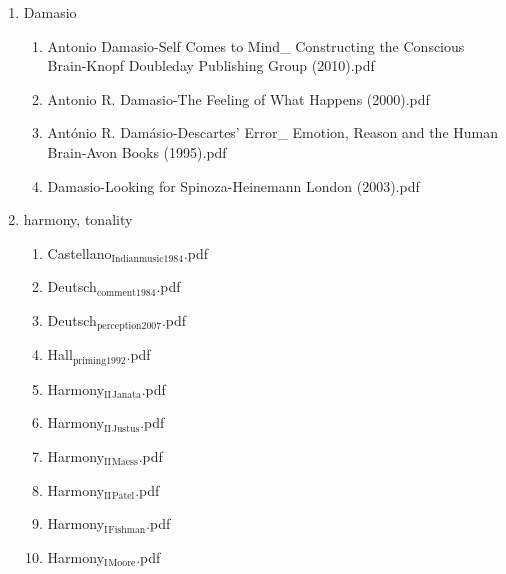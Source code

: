 \documentclass[11pt]{article}
\begin{document}
\begin{enumerate}
\item Damasio
\label{sec-1-1-1-1-30-27}
\begin{enumerate}
\item Antonio Damasio-Self Comes to Mind\_ Constructing the Conscious Brain-Knopf Doubleday Publishing Group (2010).pdf
\label{sec-1-1-1-1-30-27-1}

\item Antonio R. Damasio-The Feeling of What Happens (2000).pdf
\label{sec-1-1-1-1-30-27-2}

\item António R. Damásio-Descartes’ Error\_ Emotion, Reason and the Human Brain-Avon Books (1995).pdf
\label{sec-1-1-1-1-30-27-3}

\item Damasio-Looking for Spinoza-Heinemann London (2003).pdf
\label{sec-1-1-1-1-30-27-4}
\end{enumerate}

\item harmony, tonality
\label{sec-1-1-1-1-30-28}
\begin{enumerate}
\item Castellano$_{\text{Indianmusic1984}}$.pdf
\label{sec-1-1-1-1-30-28-1}

\item Deutsch$_{\text{comment1984}}$.pdf
\label{sec-1-1-1-1-30-28-2}

\item Deutsch$_{\text{perception2007}}$.pdf
\label{sec-1-1-1-1-30-28-3}

\item Hall$_{\text{priming1992}}$.pdf
\label{sec-1-1-1-1-30-28-4}

\item Harmony$_{\text{II}}$$_{\text{Janata}}$.pdf
\label{sec-1-1-1-1-30-28-5}

\item Harmony$_{\text{II}}$$_{\text{Justus}}$.pdf
\label{sec-1-1-1-1-30-28-6}

\item Harmony$_{\text{II}}$$_{\text{Maess}}$.pdf
\label{sec-1-1-1-1-30-28-7}

\item Harmony$_{\text{II}}$$_{\text{Patel}}$.pdf
\label{sec-1-1-1-1-30-28-8}

\item Harmony$_{\text{I}}$$_{\text{Fishman}}$.pdf
\label{sec-1-1-1-1-30-28-9}

\item Harmony$_{\text{I}}$$_{\text{Moore}}$.pdf
\label{sec-1-1-1-1-30-28-10}


\end{enumerate}
\end{enumerate}
\end{document}
